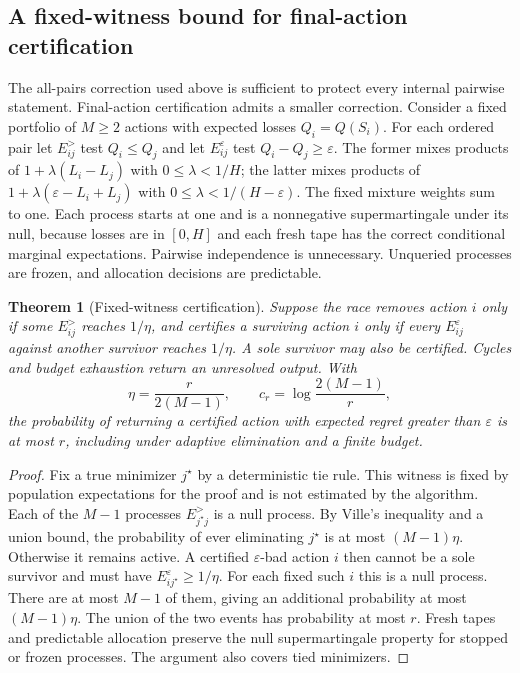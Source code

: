 \documentclass[preprint,11pt,sort&compress]{elsarticle}
\newtheorem{theorem}{Theorem}
\begin{document}
\subsection{A fixed-witness bound for final-action certification}
\label{sec:witness_bound}
The all-pairs correction used above is sufficient to protect every internal
pairwise statement. Final-action certification admits a smaller correction.
Consider a fixed portfolio of $M\ge2$ actions with expected losses $Q_i=Q(S_i)$.
For each ordered pair let $E^{>}_{ij}$ test $Q_i\le Q_j$ and let
$E^\varepsilon_{ij}$ test $Q_i-Q_j\ge\varepsilon$.
The former mixes products of $1+\lambda(L_i-L_j)$ with
$0\le\lambda<1/H$; the latter mixes products of
$1+\lambda(\varepsilon-L_i+L_j)$ with
$0\le\lambda<1/(H-\varepsilon)$. The fixed mixture weights sum to one.
Each process starts at one and is a nonnegative supermartingale under its
null, because losses are in $[0,H]$ and each fresh tape has the correct
conditional marginal expectations. Pairwise independence is unnecessary.
Unqueried processes are frozen, and allocation decisions are predictable.

\begin{theorem}[Fixed-witness certification]
\label{thm:witness}
Suppose the race removes action $i$ only if some $E^{>}_{ij}$ reaches $1/\eta$,
and certifies a surviving action $i$ only if every
$E^\varepsilon_{ij}$ against another survivor reaches $1/\eta$.
A sole survivor may also be certified. Cycles and budget exhaustion return
an unresolved output. With
\begin{equation}
 \eta=\frac{r}{2(M-1)},\qquad
 c_r=\log\frac{2(M-1)}{r},
\end{equation}
the probability of returning a certified action with expected regret greater
than $\varepsilon$ is at most $r$, including under adaptive elimination and
a finite budget.
\end{theorem}
\begin{proof}
Fix a true minimizer $j^\star$ by a deterministic tie rule. This witness is
fixed by population expectations for the proof and is not estimated by the
algorithm. Each of the $M-1$ processes $E^{>}_{j^\star j}$ is a null process.
By Ville's inequality and a union bound, the probability of ever eliminating
$j^\star$ is at most $(M-1)\eta$. Otherwise it remains active. A certified
$\varepsilon$-bad action $i$ then cannot be a sole survivor and must have
$E^\varepsilon_{i j^\star}\ge1/\eta$. For each fixed such $i$ this is a null
process. There are at most $M-1$ of them, giving an additional probability
at most $(M-1)\eta$. The union of the two events has probability at most
$r$. Fresh tapes and predictable allocation preserve the null
supermartingale property for stopped or frozen processes. The argument
also covers tied minimizers.
\end{proof}
\end{document}
